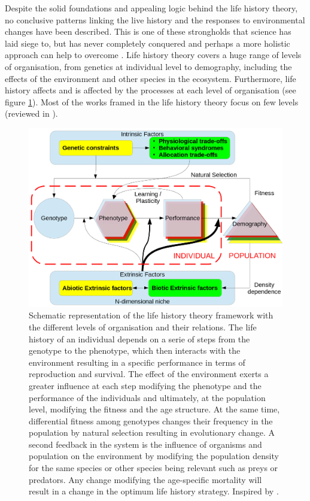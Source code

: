 Despite the solid foundations and appealing logic behind the life history
theory, no conclusive patterns linking the live history and the responses to
environmental changes have been described. This is one of these strongholds
that science has laid siege to, but has never completely conquered and perhaps a
more holistic approach can help to overcome \citep[p.~269--274]{levins1985}.
Life history theory covers a huge range of levels of organisation, from genetics
at individual level to demography, including the effects of the environment and
other species in the ecosystem. Furthermore, life history affects and is
affected by the processes at each level of organisation (see figure
\ref{fig:fig1.1}). Most of the works framed in the life history theory focus on
few levels (reviewed in \citet{Stearns2000}).


\begin{figure}
\centering
\includegraphics[width=\textwidth]{./Figures/intro/esquemaLH.png}
\caption[LH schema]{
Schematic representation of the life history theory framework with the
different levels of organisation and their relations.
The life history of an individual depends on a serie of steps from the
genotype to the phenotype, which then interacts with the environment resulting
in a specific performance in terms of reproduction and survival. The effect of
the environment exerts a greater influence at each step modifying the phenotype
and the performance of the individuals and ultimately, at the population level,
modifying the fitness and the age structure.
At the same time, differential fitness among genotypes changes their frequency
in the population by natural selection resulting in evolutionary change. A
second feedback in the system is the influence of organisms and population
on the environment by modifying the population density for the same
species or other species being relevant such as preys or predators. Any change
modifying the age-specific mortality will result in a change in the optimum
life history strategy. Inspired by \citet{Ricklefs2002}.
}
\label{fig:fig1.1}
\end{figure}


